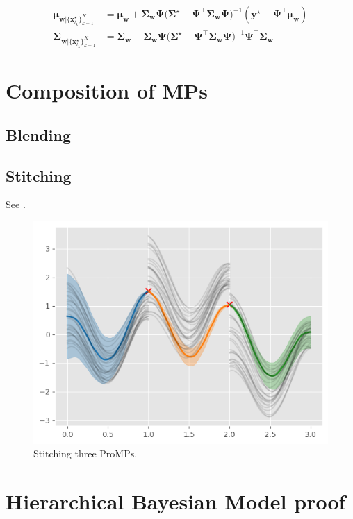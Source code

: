 \documentclass{article}
\begin{document}
\begin{align}
\bm{\mu}_{\bm{w}|\{\bm{x}_{t_k}^\star\}_{k=1}^K} &= \bm{\mu_w} + \bm{\Sigma_w}\bm{\Psi} \Big(\bm{\Sigma}^\star + \bm{\Psi}^\top \bm{\Sigma_w}\bm{\Psi} \Big)^{-1} (\bm{y}^\star - \bm{\Psi}^\top \bm{\mu_w})\\
\bm{\Sigma}_{\bm{w}|\{\bm{x}_{t_k}^\star\}_{k=1}^K} &= \bm{\Sigma_w} - \bm{\Sigma_w}\bm{\Psi} \Big(\bm{\Sigma}^\star + \bm{\Psi}^\top \bm{\Sigma_w}\bm{\Psi} \Big)^{-1} \bm{\Psi}^\top \bm{\Sigma_w}
\end{align}


\section{Composition of MPs}
\subsection{Blending}
\subsection{Stitching}
See .
\begin{figure}[htbp]
  \centering
  \includegraphics[width=0.5\linewidth]{fig/stitching.png}
  \caption{Stitching three ProMPs.}
  \label{fig:stitching}
\end{figure}


\FloatBarrier




\appendix
\section{Hierarchical Bayesian Model proof}
\end{document}
